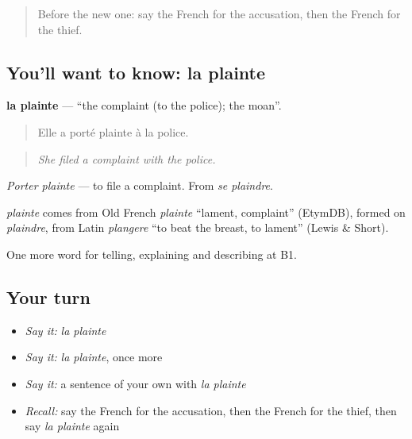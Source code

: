 \label{lesson:FR-C386-plainte}



\begin{quote}
Before the new one: say the French for the accusation, then the French for the thief.
\end{quote}

\subsection*{You'll want to know: la plainte}
\textbf{la plainte} — \textquotedblleft{}the complaint (to the police); the moan\textquotedblright{}.

\begin{quote}
Elle a porté plainte à la police.
\end{quote}

\begin{quote}
\emph{She filed a complaint with the police.}
\end{quote}

\emph{Porter plainte} — to file a complaint. From \emph{se plaindre}.

\begin{cousinweb}
\emph{plainte} comes from Old French \emph{plainte} \textquotedblleft{}lament, complaint\textquotedblright{} (EtymDB), formed on \emph{plaindre}, from Latin \emph{plangere} \textquotedblleft{}to beat the breast, to lament\textquotedblright{} (Lewis \& Short).
\end{cousinweb}

\begin{grammarlens}[title={What you've built}]
One more word for telling, explaining and describing at B1.
\end{grammarlens}

\subsection*{Your turn}
\begin{itemize}
\raggedright
  \item \emph{Say it:} \emph{la plainte}
  \item \emph{Say it:} \emph{la plainte}, once more
  \item \emph{Say it:} a sentence of your own with \emph{la plainte}
  \item \emph{Recall:} say the French for the accusation, then the French for the thief, then say \emph{la plainte} again
\end{itemize}

